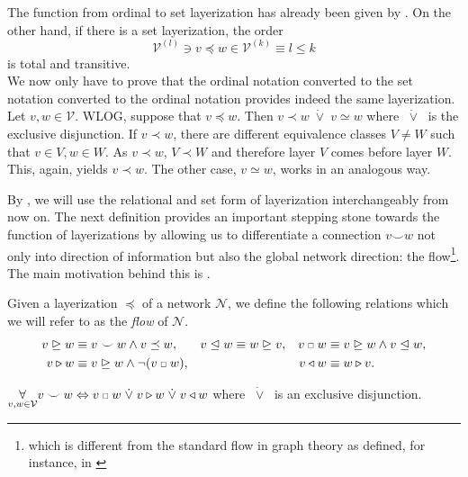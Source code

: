 \documentclass[a4paper,11pt]{report}
\newcommand{\conn}{\smile} %
\newcommand{\smallsquare}{\;\scalebox{0.6}{$\square$}\;}
\newcommand{\xor}{\;\dot{\vee}\;}
\begin{document}
\begin{Bew}
The function from ordinal to set layerization has already been given by . On the other hand, if there is a set layerization, the order
\[
\mathcal{V}^{(l)}\ni v\preceq w\in\mathcal{V}^{(k)}\equiv l\le k
\]
is total and transitive.\\
We now only have to prove that the ordinal notation converted to the set notation converted to the ordinal notation provides indeed the same layerization. Let $v,w\in\mathcal{V}$. WLOG, suppose that $v\preceq w$. Then $v\prec w\xor v\simeq w$ where $\xor$ is the exclusive disjunction. If $v\prec w$, there are different equivalence classes $V\ne W$ such that $v\in V,w\in W$. As $v\prec w$, $V\prec W$ and therefore layer $V$ comes before layer $W$. This, again, yields $v\prec w$. The other case, $v\simeq w$, works in an analogous way.
\end{Bew}

\begin{Par}
By , we will use the relational and set form of layerization interchangeably from now on. The next definition provides an important stepping stone towards the function of layerizations by allowing us to differentiate a connection $v\conn w$ not only into direction of information but also the global network direction: the flow\footnote{
which is different from the standard flow in graph theory as defined, for instance, in \cite[][149]{Diestel2017}}. The main motivation behind this is .
\end{Par}

\begin{Def}
Given a layerization $\preceq$ of a network $\mathcal{N}$, we define the following relations which we will refer to as the \emph{flow} of $\mathcal{N}$.
\begin{equation}
\begin{aligned}
v\trianglerighteq w&\equiv 
v\conn w\wedge v\preceq w,&
v\trianglelefteq w&\equiv w\trianglerighteq v,&
v\smallsquare w&\equiv v\trianglerighteq w\wedge v\trianglelefteq w,\\
v\triangleright w &\equiv v\trianglerighteq w\wedge\neg(v\smallsquare w),&&&
v\triangleleft w&\equiv w\triangleright v.
\end{aligned}
\end{equation}
\end{Def}

\begin{Lem}
$\underset{v,w\in\mathcal{V}}{\forall}v\conn w\Leftrightarrow v\smallsquare w\xor v\triangleright w\xor v\triangleleft w$ where $\xor$ is an exclusive disjunction.
\end{Lem}
\end{document}
